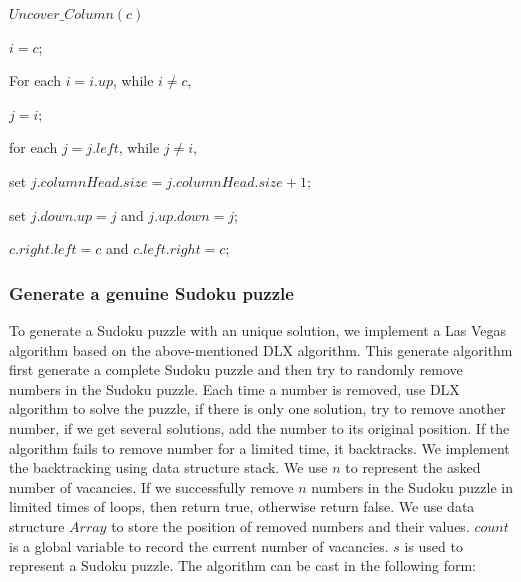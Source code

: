 \documentclass{mcmthesis}
\begin{document}
\begin{framed}
\begin{list}{.}
{\setlength{\parsep}{0ex}\setlength{\itemsep}{0ex}}
\item[] $Uncover\_Column(c)$
\item[] $i = c$;
\item[] For each $i = i.up$, while $i \ne c$,
\item[] \qquad $j = i$;
\item[] \qquad\qquad for each $j = j.left$, while $j \ne i$,
\item[] \qquad\qquad set $j.columnHead.size = j.columnHead.size + 1$;
\item[] \qquad\qquad set $j.down.up = j$ and $j.up.down = j$;
\item[] $c.right.left = c$ and $c.left.right = c$;
\end{list}
\end{framed}
\subsubsection{Generate a genuine Sudoku puzzle}
To generate a Sudoku puzzle with an unique solution, we implement a Las Vegas algorithm based on the above-mentioned DLX algorithm. This generate algorithm first generate a complete Sudoku puzzle and then try to randomly remove numbers in the Sudoku puzzle. Each time a number is removed, use DLX algorithm to solve the puzzle, if there is only one solution, try to remove another number, if we get several solutions, add the number to its original position. If the algorithm fails to remove number for a limited time, it backtracks. We implement the backtracking using data structure stack. We use $n$ to represent the asked number of vacancies. If we successfully remove $n$ numbers in the Sudoku puzzle in limited times of loops, then return true, otherwise return false. We use data structure $Array$ to store the position of removed numbers and their values. $count$ is a global variable to record the current number of vacancies. $s$ is used to represent a Sudoku puzzle. The algorithm can be cast in the following form:
\end{document}
